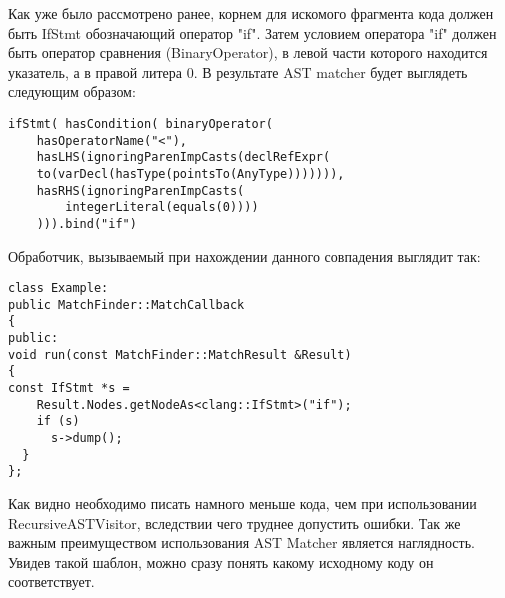 Как уже было рассмотрено ранее, корнем для искомого фрагмента кода должен быть IfStmt обозначающий
оператор "if". Затем условием оператора "if" должен быть оператор сравнения (BinaryOperator), 
в левой части которого находится указатель, а в правой литера 0. В результате AST matcher будет
выглядеть следующим образом: 
\begin{lstlisting}
ifStmt( hasCondition( binaryOperator(
	hasOperatorName("<"),
	hasLHS(ignoringParenImpCasts(declRefExpr(
    to(varDecl(hasType(pointsTo(AnyType))))))),
    hasRHS(ignoringParenImpCasts(
    	integerLiteral(equals(0))))
    ))).bind("if")
\end{lstlisting}

Обработчик, вызываемый при нахождении данного совпадения выглядит так:
\begin{lstlisting}
class Example:
public MatchFinder::MatchCallback 
{
public:
void run(const MatchFinder::MatchResult &Result) 
{
const IfStmt *s = 
	Result.Nodes.getNodeAs<clang::IfStmt>("if");
    if (s)
      s->dump();
  }
};
\end{lstlisting}

Как видно необходимо писать намного меньше кода, чем при использовании RecursiveASTVisitor,
вследствии чего труднее допустить ошибки. Так же важным преимуществом использования AST Matcher
является наглядность. Увидев такой шаблон, можно сразу понять какому исходному коду он соответствует. 
